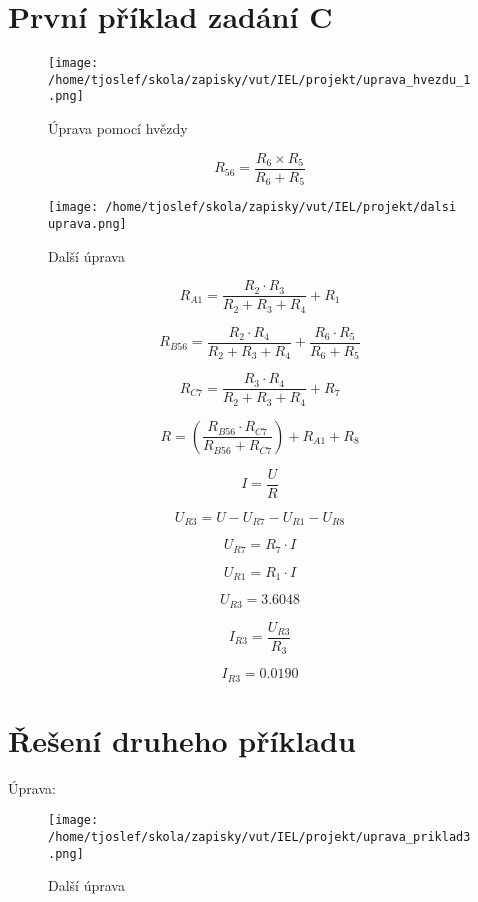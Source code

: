 \documentclass{article}
\begin{document}
\sloppy

\section{První příklad zadání C}

\begin{figure}[!ht]
  \centering
  \texttt{[image: /home/tjoslef/skola/zapisky/vut/IEL/projekt/uprava\_hvezdu\_1.png]}
  \caption{Úprava pomocí hvězdy}
  \label{fig:hvezda}
\end{figure}

\[
    R_{56} = \frac{R_6 \times R_5}{R_6 + R_5}
\]

\begin{figure}[!ht]
  \centering
  \texttt{[image: /home/tjoslef/skola/zapisky/vut/IEL/projekt/dalsi uprava.png]}
  \caption{Další úprava}
  \label{fig:dalsi_uprava}
\end{figure}


\[
R_{A1} = \frac{R_2 \cdot R_3}{R_2 + R_3 + R_4} + R_1
\]

\[
R_{B56} = \frac{R_2 \cdot R_4}{R_2 + R_3 + R_4} + \frac{R_6 \cdot R_5}{R_6 + R_5}
\]

\[
R_{C7} = \frac{R_3 \cdot R_4}{R_2 + R_3 + R_4} + R_7
\]

\[
R = \left(\frac{R_{B56} \cdot R_{C7}}{R_{B56} + R_{C7}}\right) + R_{A1} + R_8
\]

\[
I = \frac{U}{R}
\]

\[
U_{R3} = U - U_{R7} - U_{R1} - U_{R8}
\]

\[
U_{R7} = R_7 \cdot I
\]

\[
U_{R1} = R_1 \cdot I
\]

\[
U_{R3} = 3.6048
\]

\[
I_{R3} = \frac{U_{R3}}{R_3}
\]

\[
I_{R3} = 0.0190
\]
\clearpage
\section{Řešení druheho příkladu}
Úprava:

\begin{figure}[!ht]
  \centering
  \texttt{[image: /home/tjoslef/skola/zapisky/vut/IEL/projekt/uprava\_priklad3.png]}
  \caption{Další úprava}
  \label{fig:upravapriklad2}
\end{figure}
\end{document}

